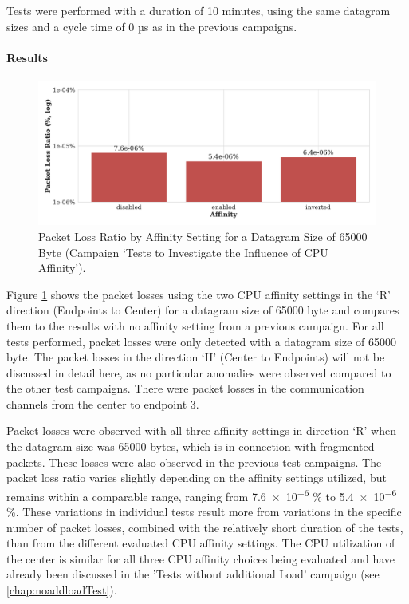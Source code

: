Tests were performed with a duration of 10 minutes, using the same datagram sizes and a cycle time of 0 µs as in the previous campaigns.

\paragraph{Results}

\begin{figure}[h]
    \centering
    \includegraphics[width=1\linewidth]{figures/reliability/ihawk/diagr9.pdf}
    \caption{Packet Loss Ratio by Affinity Setting for a Datagram Size of 65000 Byte (Campaign `Tests to Investigate the Influence of \ac{CPU} Affinity').}
    \label{fig:diagr9Loss}
\end{figure}

Figure \ref{fig:diagr9Loss} shows the packet losses using the two \ac{CPU} affinity settings in the `R' direction (Endpoints to Center) for a datagram size of 65000 byte and compares them to the results with no affinity setting from a previous campaign. For all tests performed, packet losses were only detected with a datagram size of 65000 byte. The packet losses in the direction `H' (Center to Endpoints) will not be discussed in detail here, as no particular anomalies were observed compared to the other test campaigns. There were packet losses in the communication channels from the center to endpoint 3.

Packet losses were observed with all three affinity settings in direction `R' when the datagram size was 65000 bytes, which is in connection with fragmented packets. These losses were also observed in the previous test campaigns.  The packet loss ratio varies slightly depending on the affinity settings utilized, but remains within a comparable range, ranging from \num{7.6e-6} \%  to \num{5.4e-6} \%. These variations in individual tests result more from variations in the specific number of packet losses, combined with the relatively short duration of the tests, than from the different evaluated \ac{CPU} affinity settings. The \ac{CPU} utilization of the center is similar for all three \ac{CPU} affinity choices being evaluated and have already been discussed in the 'Tests without additional Load' campaign (see \ref{chap:noaddloadTest}).

